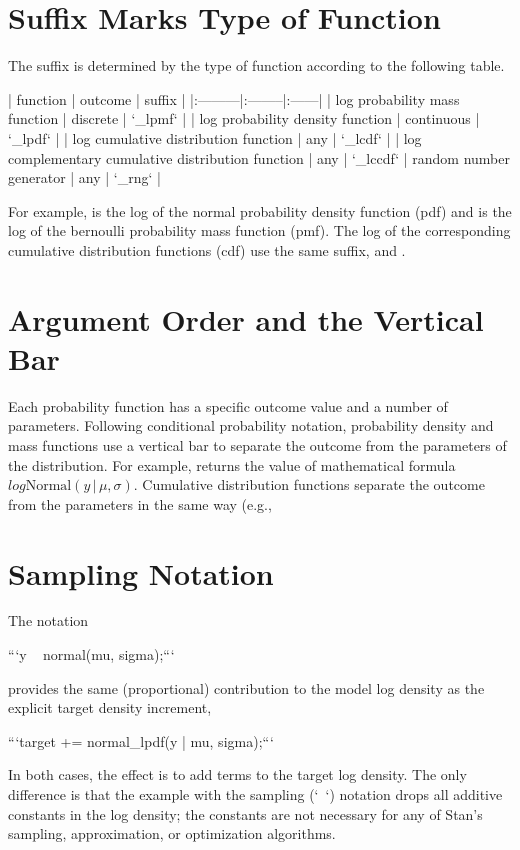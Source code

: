\begin{description}
{\begin{description}
\section{Suffix Marks Type of Function}


The suffix is determined by the type of function according to the following table.

| function   | outcome  | suffix  |
|:---------|:--------|:------|
| log probability mass function  | discrete | `_lpmf` |
| log probability density function | continuous | `_lpdf` | 
| log cumulative distribution function | any | `_lcdf` |
| log complementary cumulative distribution function | any | `_lccdf`
| random number generator | any | `_rng` |

For example,  is the log of the normal probability density function (pdf) and  is the log of the bernoulli probability mass function (pmf).  The log of the corresponding cumulative distribution functions (cdf) use the same suffix,  and .


\section{Argument Order and the Vertical Bar}


Each probability function has a specific outcome value and a number of parameters.  Following conditional probability notation, probability density and mass functions use a vertical bar to separate the outcome from the parameters of the distribution.  For example,  returns the value of mathematical formula $log \text{Normal}(y \, | \, \mu, \sigma)$. Cumulative distribution functions separate the outcome from the parameters in the same way (e.g., 


\section{Sampling Notation}


The notation


```\n y ~ normal(mu, sigma);\n ```


provides the same (proportional) contribution to the model log density as the explicit target density increment,


```\n target += normal_lpdf(y | mu, sigma);\n ```


In both cases, the effect is to add terms to the target log density. The only difference is that the example with the sampling (`~`) notation drops all additive constants in the log density;  the constants are not necessary for any of Stan's sampling, approximation, or optimization algorithms.



\end{description}}
\end{description}
